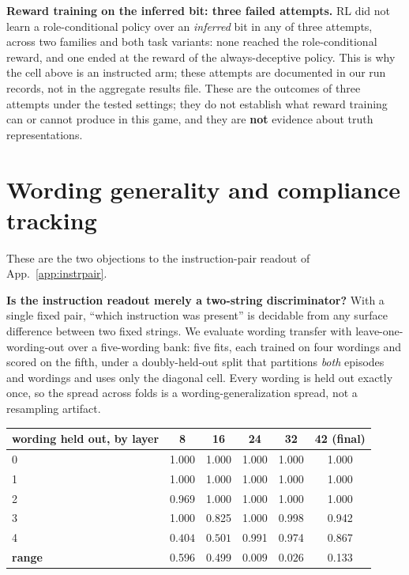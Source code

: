 \documentclass{article}
\begin{document}
\textbf{Reward training on the inferred bit: three failed attempts.} RL did not learn a role-conditional
policy over an \emph{inferred} bit in any of three attempts, across two families and both task variants: none reached the role-conditional reward, and one ended at the reward of the always-deceptive policy. This is why the cell above is an instructed arm; these attempts are documented in our run records, not in the aggregate results file. These are the outcomes of three attempts under the tested settings; they do not establish what reward training can or cannot produce in this game, and they are \textbf{not} evidence
about truth representations.

\section{Wording generality and compliance tracking}
\label{app:objections}

These are the two objections to the instruction-pair readout of App.~\ref{app:instrpair}.

\textbf{Is the instruction readout merely a two-string discriminator?} With a single fixed pair, ``which
instruction was present'' is decidable from any surface difference between two fixed strings. We evaluate wording transfer
with leave-one-wording-out over a five-wording bank: five fits, each trained on four wordings and
scored on the fifth, under a doubly-held-out split that partitions \emph{both} episodes and wordings and uses
only the diagonal cell. Every wording is held out exactly once, so the spread across folds is a
wording-generalization spread, not a resampling artifact.

\begin{center}
\small
\setlength{\tabcolsep}{4pt}
\begin{tabular}{lccccc}
\toprule
wording held out, by layer & 8 & 16 & 24 & 32 & 42 (final) \\
\midrule
0 & 1.000 & 1.000 & 1.000 & 1.000 & 1.000 \\
1 & 1.000 & 1.000 & 1.000 & 1.000 & 1.000 \\
2 & 0.969 & 1.000 & 1.000 & 1.000 & 1.000 \\
3 & 1.000 & 0.825 & 1.000 & 0.998 & 0.942 \\
4 & $\mathbf{0.404}$ & $\mathbf{0.501}$ & 0.991 & 0.974 & 0.867 \\
\midrule

\textbf{range} & 0.596 & 0.499 & $\mathbf{0.009}$ & $\mathbf{0.026}$ & 0.133 \\
\bottomrule
\end{tabular}
\end{center}
\end{document}

